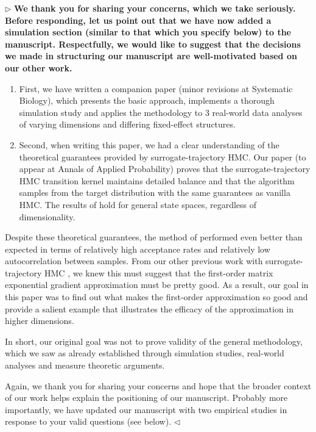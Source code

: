 \documentclass[12pt]{article}
\newenvironment{reply}{$\triangleright$\bfseries}{$\triangleleft$}
\begin{document}
\begin{reply}
	We thank you for sharing your concerns, which we take seriously.  Before responding, let us point out that we have now added a simulation section (similar to that which you specify below) to the manuscript.   Respectfully, we would like to suggest that the decisions we made in structuring our manuscript are well-motivated based on our other work.
	\begin{enumerate}
		\item First, we have written a companion paper \citet{magee2023random} (minor revisions at Systematic Biology), which presents the basic approach, implements a thorough simulation study and applies the methodology to 3 real-world data analyses of varying dimensions and differing fixed-effect structures. 
		
		\item Second, when writing this paper, we had a clear understanding of the theoretical guarantees provided by surrogate-trajectory HMC.  Our paper \citet{glatt2020accept} (to appear at Annals of Applied Probability) proves that the surrogate-trajectory HMC transition kernel maintains detailed balance and that the algorithm samples from the target distribution with the same guarantees as vanilla HMC.  The results of \citet{glatt2020accept} hold for general state spaces, regardless of dimensionality.
	\end{enumerate}

Despite these theoretical guarantees, the method of \citet{magee2023random} performed even better than expected in terms of relatively high acceptance rates and relatively low autocorrelation between samples.  From our other previous work with surrogate-trajectory HMC \citep{li2019neural}, we knew this must suggest that the first-order matrix exponential gradient approximation must be pretty good.   
As a result, our goal in this paper was to find out what makes the first-order approximation so good and provide a salient example that illustrates the efficacy of the approximation in higher dimensions.  

In short, our original goal was not to prove validity of the general methodology, which we saw as already established through simulation studies, real-world analyses and measure theoretic arguments.   

Again, we thank you for sharing your concerns and hope that the broader context of our work helps explain the positioning of our manuscript.  Probably more importantly, we have updated our manuscript with two empirical studies in response to your valid questions (see below).
\end{reply}
\end{document}
